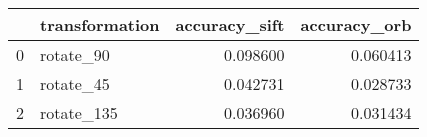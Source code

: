 \begin{tabular}{llrr}
\toprule
 & transformation & accuracy_sift & accuracy_orb \\
\midrule
0 & rotate_90 & 0.098600 & 0.060413 \\
1 & rotate_45 & 0.042731 & 0.028733 \\
2 & rotate_135 & 0.036960 & 0.031434 \\
\bottomrule
\end{tabular}
